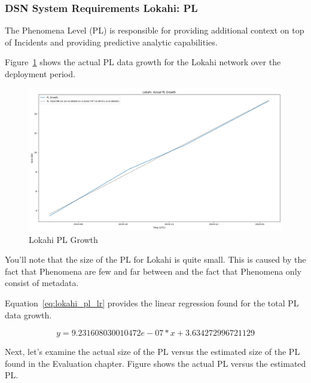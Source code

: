 \subsubsection{DSN System Requirements Lokahi: PL}

The Phenomena Level (PL) is responsible for providing additional context on top of Incidents and providing predictive analytic capabilities.

Figure~\ref{fig:lokahi_pl_actual} shows the actual PL data growth for the Lokahi network over the deployment period.

\begin{figure}[H]
    \centering
    \includegraphics[width=\linewidth]{figures/lokahi_pl_actual.png}
    \caption{Lokahi PL Growth}
    \label{fig:lokahi_pl_actual}
\end{figure}

You'll note that the size of the PL for Lokahi is quite small. This is caused by the fact that Phenomena are few and far between and the fact that Phenomena only consist of metadata.

Equation~\ref{eq:lokahi_pl_lr} provides the linear regression found for the total PL data growth.

\begin{equation}
    y = 9.231608030010472e-07 * x + 3.634272996721129
    \label{eq:lokahi_pl_lr}
\end{equation}

Next, let's examine the actual size of the PL versus the estimated size of the PL found in the Evaluation chapter. Figure shows the actual PL versus the estimated PL.

